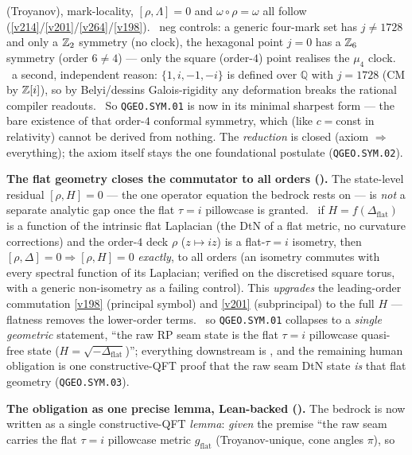 (Troyanov), mark-locality, $[\rho,\Lambda]{=}0$ and $\omega\circ\rho{=}\omega$ all follow (\vref{v214}/\vref{v201}/\vref{v264}/\vref{v198}).
\mE\ neg controls: a generic four-mark set has $j\neq1728$ and only a $\mathbb Z_2$ symmetry (no clock), the
hexagonal point $j{=}0$ has a $\mathbb Z_6$ symmetry (order $6\neq4$) --- only the square (order-$4$) point realises
the $\mu_4$ clock. \mC\ a second, independent reason: $\{1,i,-1,-i\}$ is defined over $\mathbb Q$ with $j{=}1728$
(CM by $\mathbb Z[i]$), so by Belyi/dessins Galois-rigidity any deformation breaks the rational compiler readouts.
\mO\ So \texttt{QGEO.SYM.01} is now in its minimal sharpest form --- the bare existence of that order-$4$
conformal symmetry, which (like $c{=}$const in relativity) cannot be derived from nothing. The \emph{reduction}
is closed (axiom $\Rightarrow$ everything); the axiom itself stays the one foundational postulate (\texttt{QGEO.SYM.02}).
\par\smallskip\noindent\textbf{The flat geometry closes the commutator to all orders ().}
The state-level residual $[\rho,H]{=}0$ --- the one operator equation the bedrock rests on --- is \emph{not} a
separate analytic gap once the flat $\tau{=}i$ pillowcase is granted. \mE\ if $H=f(\Delta_{\mathrm{flat}})$ is a
function of the intrinsic flat Laplacian (the DtN of a flat metric, no curvature corrections) and the order-$4$
deck $\rho$ ($z\mapsto iz$) is a flat-$\tau{=}i$ isometry, then $[\rho,\Delta]{=}0\Rightarrow[\rho,H]{=}0$
\emph{exactly}, to all orders (an isometry commutes with every spectral function of its Laplacian; verified on
the discretised square torus, with a generic non-isometry as a failing control). This \emph{upgrades} the
leading-order commutation \vref{v198} (principal symbol) and \vref{v201} (subprincipal) to the full $H$ ---
flatness removes the lower-order terms. \mO\ so \texttt{QGEO.SYM.01} collapses to a \emph{single geometric}
statement, ``the raw RP seam state is the flat $\tau{=}i$ pillowcase quasi-free state ($H{=}\sqrt{-\Delta_{\mathrm{flat}}}$)'';
everything downstream is \mE, and the remaining human obligation is one constructive-QFT proof that the raw seam
DtN state \emph{is} that flat geometry (\texttt{QGEO.SYM.03}).
\par\smallskip\noindent\textbf{The obligation as one precise lemma, Lean-backed ().}
The bedrock is now written as a single constructive-QFT \emph{lemma}: \emph{given} the premise ``the raw seam
carries the flat $\tau{=}i$ pillowcase metric $g_{\mathrm{flat}}$ (Troyanov-unique, cone angles $\pi$), so
